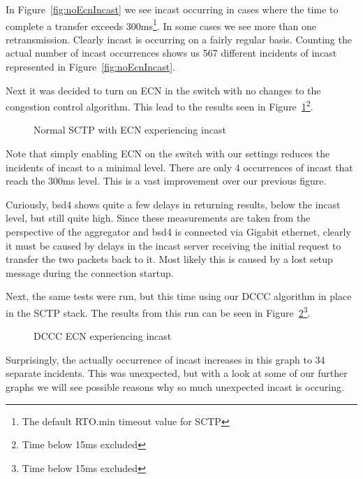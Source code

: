 \documentclass[12pt]{article}
\begin{document}
In Figure~\ref{fig:noEcnIncast} we see incast occurring in cases where the time to complete a transfer exceeds
300ms\footnote{The default RTO.min timeout value for SCTP}. In some cases we see more than
one retransmission. Clearly incast is occurring on a fairly regular basis. Counting the actual number
of incast occurrences shows us 567 different incidents of incast  represented in Figure~\ref{fig:noEcnIncast}.

\newpage

Next it was decided to turn on ECN in the switch with no changes to the congestion control algorithm. This
lead to the results seen in Figure~\ref{fig:ecnIncast}\footnote{Time below 15ms excluded}.

\begin{figure}[h]
\centering
{}
\caption{Normal SCTP with ECN experiencing incast}
\label{fig:ecnIncast}
\end{figure}


Note that simply enabling ECN on the switch with our settings reduces the incidents of incast to a minimal
level. There are only 4 occurrences of incast that reach the 300ms level. This is a vast improvement over
our previous figure.  

Curiously,  bsd4 shows quite a few delays in returning results, below the incast level, 
but still quite high. Since these measurements are taken from the perspective of the aggregator and
bsd4 is connected via Gigabit ethernet, clearly it must be caused by delays in the incast server
receiving the initial request to transfer the two packets back to it. Most likely this is caused by
a lost setup message during the connection startup.

\newpage

Next, the same tests were run, but this time using our DCCC algorithm in place in the SCTP stack. The
results from this run can be seen in Figure~\ref{fig:dcccIncast}\footnote{Time below 15ms excluded}.

\begin{figure}[h]
\centering
{}
\caption{DCCC ECN experiencing incast}
\label{fig:dcccIncast}
\end{figure}


Surprisingly, the actually occurrence of incast increases in this graph to 34 separate incidents. This
was unexpected, but with a look at some of our further graphs we will see possible
reasons why so much unexpected incast is occuring.
\end{document}
